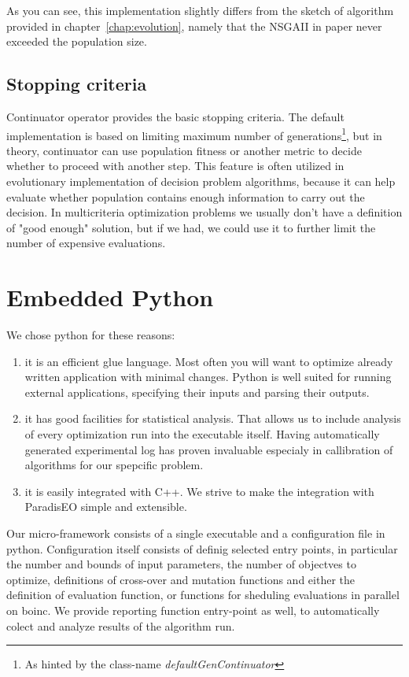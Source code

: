 \documentclass[12pt,oneside]{fithesis2}
\begin{document}
As you can see, this implementation slightly differs from the sketch of algorithm provided in chapter~\ref{chap:evolution}, namely that the NSGAII in paper\cite{deb2002fast} never exceeded the population size.

\subsection{Stopping criteria}
Continuator operator provides the basic stopping criteria. The default implementation is based on limiting maximum number of generations\footnote{As hinted by the class-name \emph{defaultGenContinuator}}, but in theory, continuator can use population fitness or another metric to decide whether to proceed with another step. This feature is often utilized in evolutionary implementation of decision problem algorithms, because it can help evaluate whether population contains enough information to carry out the decision. In multicriteria optimization problems we usually don't have a definition of "good enough" solution, but if we had, we could use it to further limit the number of expensive evaluations.

\section{Embedded Python}

We chose python for these reasons:
\begin{enumerate}
\item it is an efficient glue language. 
Most often you will want to optimize already written application with minimal changes. Python is well suited for running external applications, specifying their inputs and parsing their outputs.
 
\item it has good facilities for statistical analysis.
That allows us to include analysis of every optimization run into the executable itself. Having automatically generated experimental log has proven invaluable especialy in callibration of algorithms for our spepcific problem.

\item it is easily integrated with C++.
We strive to make the integration with ParadisEO simple and extensible. 
\end{enumerate}

Our micro-framework consists of a single executable and a configuration file in python. Configuration itself consists of definig selected entry points, in particular the number and bounds of input parameters, the number of objectves to optimize, definitions of cross-over and mutation functions and either the definition of evaluation function, or functions for sheduling evaluations in parallel on boinc. We provide reporting function entry-point as well, to automatically colect and analyze results of the algorithm run.
\end{document}
